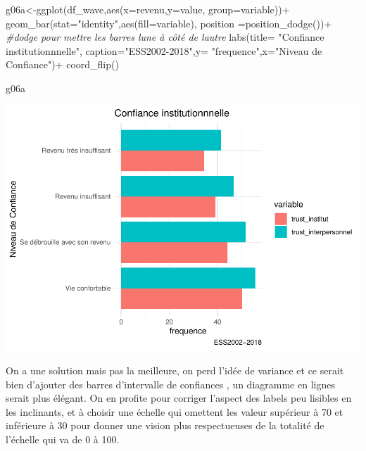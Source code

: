 \documentclass[
]{book}
\newenvironment{Shaded}{\begin{snugshade}}{\end{snugshade}}
\newcommand{\AttributeTok}[1]{\textcolor[rgb]{0.77,0.63,0.00}{#1}}
\newcommand{\CommentTok}[1]{\textcolor[rgb]{0.56,0.35,0.01}{\textit{#1}}}
\newcommand{\FunctionTok}[1]{\textcolor[rgb]{0.00,0.00,0.00}{#1}}
\newcommand{\NormalTok}[1]{#1}
\newcommand{\OtherTok}[1]{\textcolor[rgb]{0.56,0.35,0.01}{#1}}
\newcommand{\SpecialCharTok}[1]{\textcolor[rgb]{0.00,0.00,0.00}{#1}}
\newcommand{\StringTok}[1]{\textcolor[rgb]{0.31,0.60,0.02}{#1}}
\begin{document}
\begin{Shaded}
\begin{Highlighting}[]
\NormalTok{g06a}\OtherTok{\textless{}{-}}\FunctionTok{ggplot}\NormalTok{(df\_wave,}\FunctionTok{aes}\NormalTok{(}\AttributeTok{x=}\NormalTok{revenu,}\AttributeTok{y=}\NormalTok{value, }\AttributeTok{group=}\NormalTok{variable))}\SpecialCharTok{+}
  \FunctionTok{geom\_bar}\NormalTok{(}\AttributeTok{stat=}\StringTok{"identity"}\NormalTok{,}\FunctionTok{aes}\NormalTok{(}\AttributeTok{fill=}\NormalTok{variable), }\AttributeTok{position =}\FunctionTok{position\_dodge}\NormalTok{())}\SpecialCharTok{+}            \CommentTok{\#dodge pour mettre les barres l\textquotesingle{}une à côté de l\textquotesingle{}autre}
  \FunctionTok{labs}\NormalTok{(}\AttributeTok{title=} \StringTok{"Confiance institutionnnelle"}\NormalTok{, }\AttributeTok{caption=}\StringTok{"ESS2002{-}2018"}\NormalTok{,}\AttributeTok{y=} \StringTok{"frequence"}\NormalTok{,}\AttributeTok{x=}\StringTok{"Niveau de Confiance"}\NormalTok{)}\SpecialCharTok{+}
  \FunctionTok{coord\_flip}\NormalTok{()}

\NormalTok{g06a}
\end{Highlighting}
\end{Shaded}

\includegraphics{bookdown-demo_files/figure-latex/0420-1.pdf}

On a une solution mais pas la meilleure, on perd l'idée de variance et ce serait bien d'ajouter des barres d'intervalle de confiances , un diagramme en lignes serait plus élégant. On en profite pour corriger l'aspect des labels peu lisibles en les inclinants, et à choisir une échelle qui omettent les valeur supérieur à 70 et inférieure à 30 pour donner une vision plus respectueuses de la totalité de l'échelle qui va de 0 à 100.
\end{document}
